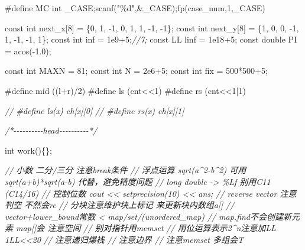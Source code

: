 \documentclass[
]{article}
\newenvironment{Shaded}{}{}
\newcommand{\AttributeTok}[1]{\textcolor[rgb]{0.49,0.56,0.16}{#1}}
\newcommand{\CommentTok}[1]{\textcolor[rgb]{0.38,0.63,0.69}{\textit{#1}}}
\newcommand{\DataTypeTok}[1]{\textcolor[rgb]{0.56,0.13,0.00}{#1}}
\newcommand{\DecValTok}[1]{\textcolor[rgb]{0.25,0.63,0.44}{#1}}
\newcommand{\FloatTok}[1]{\textcolor[rgb]{0.25,0.63,0.44}{#1}}
\newcommand{\NormalTok}[1]{#1}
\newcommand{\PreprocessorTok}[1]{\textcolor[rgb]{0.74,0.48,0.00}{#1}}
\newcommand{\SpecialCharTok}[1]{\textcolor[rgb]{0.25,0.44,0.63}{#1}}
\newcommand{\StringTok}[1]{\textcolor[rgb]{0.25,0.44,0.63}{#1}}
\begin{document}
\begin{Shaded}
\begin{Highlighting}[]
\PreprocessorTok{\#define MC }\DataTypeTok{int}\PreprocessorTok{ }\NormalTok{\_CASE;scanf(}\StringTok{"}\SpecialCharTok{\%d}\StringTok{"}\NormalTok{,\&\_CASE);fp(case\_num,}\DecValTok{1}\NormalTok{,\_CASE)}
   
\AttributeTok{const} \DataTypeTok{int}\NormalTok{ next\_x[}\DecValTok{8}\NormalTok{] = \{}\DecValTok{0}\NormalTok{, }\DecValTok{1}\NormalTok{, {-}}\DecValTok{1}\NormalTok{, }\DecValTok{0}\NormalTok{, }\DecValTok{1}\NormalTok{, }\DecValTok{1}\NormalTok{, {-}}\DecValTok{1}\NormalTok{, {-}}\DecValTok{1}\NormalTok{\};}
\AttributeTok{const} \DataTypeTok{int}\NormalTok{ next\_y[}\DecValTok{8}\NormalTok{] = \{}\DecValTok{1}\NormalTok{, }\DecValTok{0}\NormalTok{, }\DecValTok{0}\NormalTok{, {-}}\DecValTok{1}\NormalTok{, }\DecValTok{1}\NormalTok{, {-}}\DecValTok{1}\NormalTok{, {-}}\DecValTok{1}\NormalTok{, }\DecValTok{1}\NormalTok{\};}
\AttributeTok{const} \DataTypeTok{int}\NormalTok{ inf = }\FloatTok{1e9}\NormalTok{+}\DecValTok{5}\NormalTok{;}\CommentTok{//7;}
\AttributeTok{const}\NormalTok{ LL linf = }\FloatTok{1e18}\NormalTok{+}\DecValTok{5}\NormalTok{;}
\AttributeTok{const} \DataTypeTok{double}\NormalTok{ PI = acos({-}}\FloatTok{1.0}\NormalTok{);}
   
\AttributeTok{const} \DataTypeTok{int}\NormalTok{ MAXN = }\DecValTok{81}\NormalTok{;}
\AttributeTok{const} \DataTypeTok{int}\NormalTok{ N    = }\FloatTok{2e6}\NormalTok{+}\DecValTok{5}\NormalTok{;}
\AttributeTok{const} \DataTypeTok{int}\NormalTok{ fix  = }\DecValTok{500}\NormalTok{*}\DecValTok{500}\NormalTok{+}\DecValTok{5}\NormalTok{;}
 
\PreprocessorTok{\#define mid }\NormalTok{((l+r)/}\DecValTok{2}\NormalTok{)}
\PreprocessorTok{\#define ls }\NormalTok{(cnt\textless{}\textless{}}\DecValTok{1}\NormalTok{)}
\PreprocessorTok{\#define rs }\NormalTok{(cnt\textless{}\textless{}}\DecValTok{1}\NormalTok{|}\DecValTok{1}\NormalTok{)}
 
\CommentTok{// \#define ls(x) ch[x][0]}
\CommentTok{// \#define rs(x) ch[x][1]}
    
\CommentTok{/*{-}{-}{-}{-}{-}{-}{-}{-}{-}{-}head{-}{-}{-}{-}{-}{-}{-}{-}{-}{-}*/}

\DataTypeTok{int}\NormalTok{ work()\{\};}

\CommentTok{// 小数 二分/三分 注意break条件}
\CommentTok{// 浮点运算 sqrt(a\^{}2{-}b\^{}2) 可用 sqrt(a+b)*sqrt(a{-}b) 代替，避免精度问题}
\CommentTok{// long double {-}\textgreater{} \%Lf 别用C11 (C14/16)}
\CommentTok{// 控制位数 cout \textless{}\textless{} setprecision(10) \textless{}\textless{} ans;}
\CommentTok{// reverse vector 注意判空 不然会re}
\CommentTok{// 分块注意维护块上标记 来更新块内数组a[]}
\CommentTok{// vector+lower\_bound常数 \textless{} map/set/(unordered\_map)}
\CommentTok{// map.find不会创建新元素 map[]会 注意空间}
\CommentTok{// 别对指针用memset}
\CommentTok{// 用位运算表示2\^{}n注意加LL 1LL\textless{}\textless{}20}
\CommentTok{// 注意递归爆栈}
\CommentTok{// 注意边界}
\CommentTok{// 注意memset 多组会T}
   

\end{Highlighting}
\end{Shaded}
\end{document}
